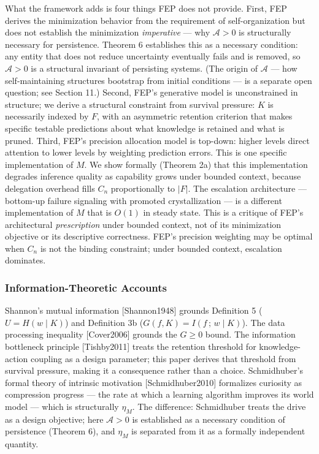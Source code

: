 \documentclass[
]{article}
\begin{document}
What the framework adds is four things FEP does not provide. First, FEP
derives the minimization behavior from the requirement of
self-organization but does not establish the minimization
\emph{imperative} --- why \(\mathcal{A} > 0\) is structurally necessary
for persistence. Theorem 6 establishes this as a necessary condition:
any entity that does not reduce uncertainty eventually fails and is
removed, so \(\mathcal{A} > 0\) is a structural invariant of persisting
systems. (The origin of \(\mathcal{A}\) --- how self-maintaining
structures bootstrap from initial conditions --- is a separate open
question; see Section 11.) Second, FEP's
generative model is unconstrained in structure; we derive a structural
constraint from survival pressure: \(K\) is necessarily indexed by
\(F\), with an asymmetric retention criterion that makes specific
testable predictions about what knowledge is retained and what is
pruned. Third, FEP's precision allocation model is top-down: higher
levels direct attention to lower levels by weighting prediction errors.
This is one specific implementation of \(M\). We show formally (Theorem
2a) that this implementation degrades inference quality as capability
grows under bounded context, because delegation overhead fills \(C_n\)
proportionally to \(|F|\). The escalation architecture --- bottom-up
failure signaling with promoted crystallization --- is a different
implementation of \(M\) that is \(O(1)\) in steady state. This is a
critique of FEP's architectural \emph{prescription} under bounded
context, not of its minimization objective or its descriptive
correctness. FEP's precision weighting may be optimal when \(C_n\) is
not the binding constraint; under bounded context, escalation dominates.

\subsubsection{Information-Theoretic
Accounts}\label{information-theoretic-accounts}

Shannon's mutual information {[}Shannon1948{]} grounds Definition 5
(\(U = H(w \mid K)\)) and Definition 3b
(\(G(f, K) = I(f\,;\,w \mid K)\)). The data processing inequality
{[}Cover2006{]} grounds the \(G \geq 0\) bound. The information
bottleneck principle {[}Tishby2011{]} treats the retention threshold for
knowledge-action coupling as a design parameter; this paper derives that
threshold from survival pressure, making it a consequence rather than a
choice. Schmidhuber's formal theory of intrinsic motivation
{[}Schmidhuber2010{]} formalizes curiosity as compression progress ---
the rate at which a learning algorithm improves its world model ---
which is structurally \(\eta_M\). The difference: Schmidhuber treats the
drive as a design objective; here \(\mathcal{A} > 0\) is established as
a necessary condition of persistence (Theorem 6), and \(\eta_M\) is
separated from it as a formally independent quantity.
\end{document}
